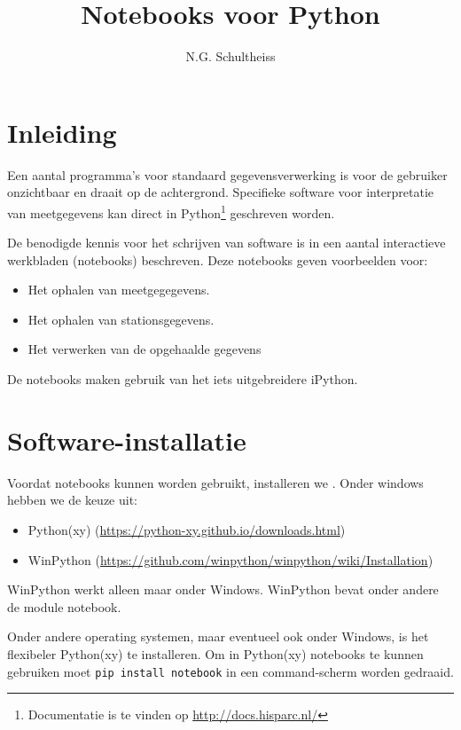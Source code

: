 

\title{Notebooks voor Python}
\author{N.G. Schultheiss}



\maketitle

\section{Inleiding}

Een aantal programma's voor standaard \hisparc gegevensverwerking is voor de gebruiker onzichtbaar
en draait op de achtergrond. Specifieke software voor interpretatie van meetgegevens kan direct in
Python\footnote{Documentatie is te vinden op \url{http://docs.hisparc.nl/}} geschreven worden.

De benodigde kennis voor het schrijven van \python software is in een aantal interactieve werkbladen
 (notebooks) beschreven. Deze notebooks geven voorbeelden voor:
\begin{itemize}
\item Het ophalen van meetgegegevens.
\item Het ophalen van stationsgegevens.
\item Het verwerken van de opgehaalde gegevens
\end{itemize}
De notebooks maken gebruik van het iets uitgebreidere iPython.

\section{Software-installatie}

Voordat notebooks kunnen worden gebruikt, installeren we . Onder windows hebben we de keuze uit:
\begin{itemize}
\item Python(xy) (\url{https://python-xy.github.io/downloads.html})
\item WinPython (\url{https://github.com/winpython/winpython/wiki/Installation})
\end{itemize}

WinPython werkt alleen maar onder Windows. WinPython bevat onder andere de module notebook.

Onder andere operating systemen, maar eventueel ook onder Windows, is het flexibeler Python(xy) te installeren.
Om in Python(xy) notebooks te kunnen gebruiken moet {\tt pip install notebook} in een command-scherm worden
gedraaid.

